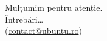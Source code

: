 \documentclass[compress]{beamer}
\begin{document}
\begin{frame}
  \begin{center}
    \huge
    Mulțumim pentru atenție.
    \\
    Întrebări\ldots
    \\
    (\href{mailto://contact@ubuntu.ro}{contact@ubuntu.ro})
  \end{center}
\end{frame}
\end{document}
